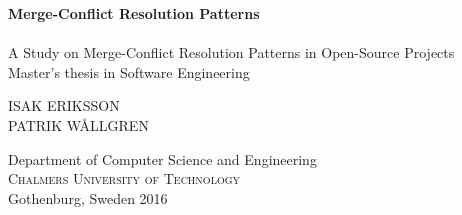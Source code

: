 
\begin{titlepage}
			
\addtolength{\voffset}{2cm}

\begin{figure}[H]
\centering
\vspace{2cm}	%
\end{figure}

\mbox{}
\vfill
\renewcommand{\familydefault}{\sfdefault} \normalfont %
\textbf{{\Huge 	Merge-Conflict Resolution Patterns 	\\[0.2cm] 
				}} 	\\[0.5cm]
{\Large A Study on Merge-Conflict Resolution Patterns in Open-Source Projects}\\[0.5cm]
Master's thesis in Software Engineering \setlength{\parskip}{1cm}

{\Large ISAK ERIKSSON\\PATRIK WÅLLGREN} \setlength{\parskip}{2.9cm}

Department of Computer Science and Engineering \\
\textsc{Chalmers University of Technology} \\
Gothenburg, Sweden 2016

\renewcommand{\familydefault}{\rmdefault} \normalfont %
\end{titlepage}


\newpage
\restoregeometry
\thispagestyle{empty}
\mbox{}


